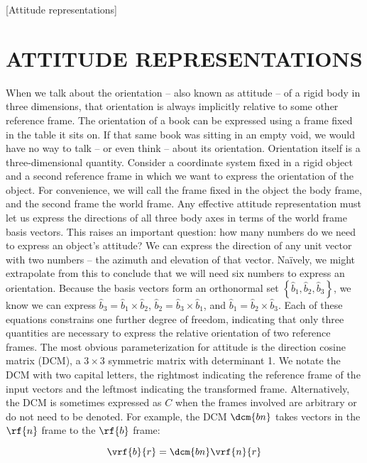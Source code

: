 [Attitude representations]

\chapter{ATTITUDE REPRESENTATIONS}

When we talk about the orientation -- also known as attitude -- of a rigid body in three dimensions, that orientation is always implicitly relative to some other reference frame. The orientation of a book can be expressed using a frame fixed in the table it sits on. If that same book was sitting in an empty void, we would have no way to talk -- or even think -- about its orientation. Orientation itself is a three-dimensional quantity. Consider a coordinate system fixed in a rigid object and a second reference frame in which we want to express the orientation of the object. For convenience, we will call the frame fixed in the object the body frame, and the second frame the world frame. Any effective attitude representation must let us express the directions of all three body axes in terms of the world frame basis vectors. This raises an important question: how many numbers do we need to express an object's attitude? We can express the direction of any unit vector with two numbers -- the azimuth and elevation of that vector. Naïvely, we might extrapolate from this to conclude that we will need six numbers to express an orientation. Because the basis vectors form an orthonormal set $\left\{ \hat{b}_1, \hat{b}_2, \hat{b}_3\right\}$, we know we can express $\hat{b}_3 = \hat{b}_1 \times \hat{b}_2$, $\hat{b}_2 = \hat{b}_3 \times \hat{b}_1$, and $\hat{b}_1 = \hat{b}_2 \times \hat{b}_3$. Each of these equations constrains one further degree of freedom, indicating that only three quantities are necessary to express the relative orientation of two reference frames. The most obvious parameterization for attitude is the direction cosine matrix (DCM), a $3\times3$ symmetric matrix with determinant 1. We notate the DCM with two capital letters, the rightmost indicating the reference frame of the input vectors and the leftmost indicating the transformed frame. Alternatively, the DCM is sometimes expressed as $C$ when the frames involved are arbitrary or do not need to be denoted. For example, the DCM $\dcm{bn}$ takes vectors in the $\rf{n}$ frame to the $\rf{b}$ frame:

\begin{equation}
    \vrf{b}{r} = \dcm{bn} \vrf{n}{r}
\end{equation}

